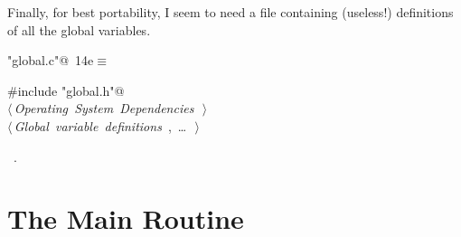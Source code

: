 \documentclass[a4paper]{report}
\begin{document}
Finally, for best portability, I seem to need a file containing
(useless!) definitions of all the global variables.
\begin{flushleft} \small
\begin{minipage}{\linewidth}\label{scrap14}\raggedright\small
{} \verb@"global.c"@\nobreak\ {\footnotesize {14e}}$\equiv$
\vspace{-1ex}
\begin{list}{}{} \item
\mbox{}\verb@#include "global.h"@\\
\mbox{}\verb@@\hbox{$\langle\,${\it Operating System Dependencies}\nobreak\ {\footnotesize {}}$\,\rangle$}\verb@@\\
\mbox{}\verb@@\hbox{$\langle\,${\it Global variable definitions}\nobreak\ {\footnotesize {}, \ldots\ }$\,\rangle$}\verb@@\\
\mbox{}\verb@@{\NWsep}
\end{list}
\vspace{-1.5ex}
\footnotesize
\begin{list}{}{\setlength{\itemsep}{-\parsep}\setlength{\itemindent}{-\leftmargin}}
\item \NWtxtFileDefBy\ .

\item{}
\end{list}
\end{minipage}\vspace{4ex}
\end{flushleft}
\section{The Main Routine} \label{main-routine}
\end{document}
